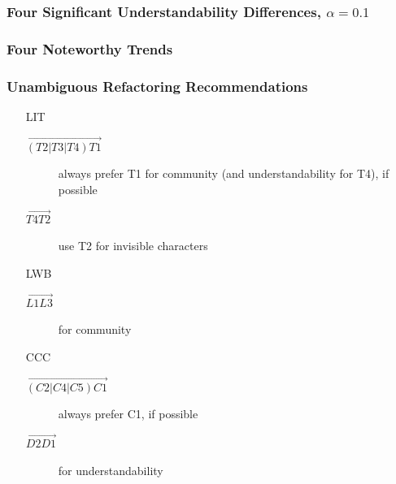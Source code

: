 \begin{frame}
\frametitle{Four Significant Understandability Differences, $\alpha=0.1$}

\end{frame}


\begin{frame}
\frametitle{Four Noteworthy Trends}

\end{frame}


\begin{frame}
\frametitle{Unambiguous Refactoring Recommendations}
\begin{itemize}
\item[LIT]
\begin{description}
\item[$\overrightarrow{(T2|T3|T4) T1}$] always prefer T1 for community (and understandability for T4), if possible
\item[$\overrightarrow{T4 T2}$] use T2 for invisible characters
\end{description}
\item[LWB]
\begin{description}
\item[$\overrightarrow{L1 L3}$] for community
\end{description}
\item[CCC]
\begin{description}
\item[$\overrightarrow{(C2|C4|C5) C1}$] always prefer C1, if possible
\end{description}
\begin{description}
\item[$\overrightarrow{D2 D1}$] for understandability
\end{description}
\end{itemize}
\end{frame}


\note[itemize]{
\item[LIT]
}

